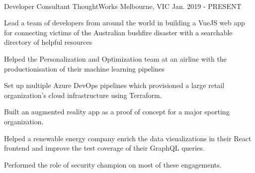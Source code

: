 
 \

\begin{cventries}

    \cventry
    {Developer Consultant} %
    {ThoughtWorks} %
    {Melbourne, VIC} %
    {Jan. 2019 - PRESENT} %
    {
        \begin{cvitems} %
        \item {Lead a team of developers from around the world in building a VueJS web app for connecting victims of the Australian bushfire disaster with a searchable directory of helpful resources}
        \item {Helped the Personalization and Optimization team at an airline with the productionisation of their machine learning pipelines}
        \item {Set up multiple Azure DevOps pipelines which provisioned a large retail organization's cloud infrastructure using Terraform.}
        \item {Built an augmented reality app as a proof of concept for a major sporting organization.}
        \item {Helped a renewable energy company enrich the data visualizations in their React frontend and improve the test coverage of their GraphQL queries.}
        \item {Performed the role of security champion on most of these engagements.}
        \end{cvitems}
    }


\end{cventries}
